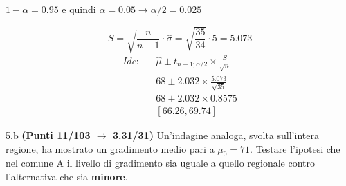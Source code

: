 \documentclass[
  11pt,
]{book}
\theoremstyle{mytheoremstyle}
\theoremstyle{mydefstyle}
\newenvironment{sol}
  {
  \begin{tcolorbox}[enhanced,breakable,arc=0.1mm,boxrule=1pt,colback=white,colframe=iblue,
  title=\bf \fontfamily{lmss}\selectfont \hspace{.5 cm} Soluzione,drop fuzzy shadow]

}{
\end{tcolorbox}
  }
\begin{document}
\begin{sol}
\(1-\alpha =0.95\) e quindi \(\alpha=0.05\rightarrow \alpha/2=0.025\)

\[
      S  =\sqrt{\frac {n}{n-1}}\cdot\hat\sigma =
     \sqrt{\frac { 35 }{ 34 }}\cdot 5 = 5.073 
\]
\begin{eqnarray*}
  Idc: & &  \hat\mu \pm  t_{n-1;\alpha/2} \times \frac{S}{\sqrt{n}} \\
     & &  68 \pm  2.032 \times \frac{ 5.073 }{\sqrt{ 35 }} \\
     & &  68 \pm  2.032 \times  0.8575 \\
     & & [ 66.26 ,  69.74 ]
\end{eqnarray*}

\end{sol}

5.b \textbf{(Punti 11/103 \(\rightarrow\) 3.31/31)} Un'indagine analoga, svolta sull'intera regione, ha mostrato un gradimento medio pari a \(\mu_0=71\). Testare l'ipotesi che nel comune A il livello di gradimento sia uguale a quello regionale contro l'alternativa che sia \textbf{minore}.
\end{document}
